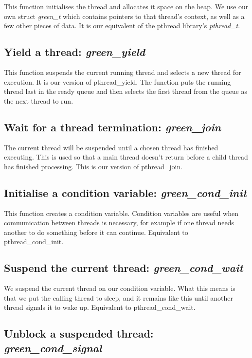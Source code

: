 \documentclass[11pt]{article}
\begin{document}
This function initialises the thread and allocates it space on the heap. We use our own struct \textit{green\_t} which contains pointers to that thread's context, as well as a few other pieces of data. It is our equivalent of the pthread library's \textit{pthread\_t}.

\subsection{Yield a thread: \textit{green\_yield}}

This function suspends the current running thread and selects a new thread for execution. It is our version of pthread\_yield. The function puts the running thread last in the ready queue and then selects the first thread from the queue as the next thread to run.
\subsection{Wait for a thread termination: \textit{green\_join}}

The current thread will be suspended until a chosen thread has finished executing. This is used so that a main thread doesn't return before a child thread has finished processing. This is our version of pthread\_join.

\subsection{Initialise a condition variable: \textit{green\_cond\_init}}

This function creates a condition variable. Condition variables are useful when communication between threads is necessary, for example if one thread needs another to do something before it can continue. Equivalent to pthread\_cond\_init.

\subsection{Suspend the current thread: \textit{green\_cond\_wait}}

We suspend the current thread on our condition variable. What this means is that we put the calling thread to sleep, and it remains like this until another thread signals it to wake up. Equivalent to pthread\_cond\_wait.

\subsection{Unblock a suspended thread: \textit{green\_cond\_signal}}
\end{document}
